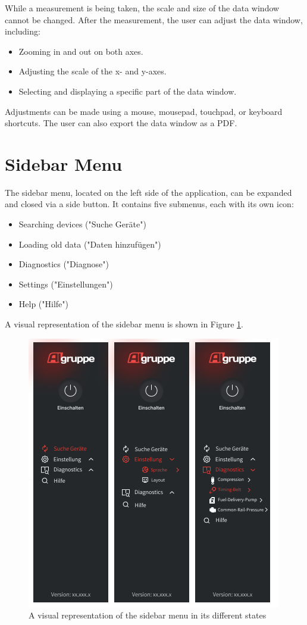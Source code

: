 \documentclass[]{scrreprt}
\begin{document}
While a measurement is being taken, the scale and size of the data window cannot be changed. After the measurement, the user can adjust the data window, including:
\begin{itemize}
\item Zooming in and out on both axes.
\item Adjusting the scale of the x- and y-axes.
\item Selecting and displaying a specific part of the data window.
\end{itemize}

Adjustments can be made using a mouse, mousepad, touchpad, or keyboard shortcuts. The user can also export the data window as a PDF.

\section{Sidebar Menu}

The sidebar menu, located on the left side of the application, can be expanded and closed via a side button. It contains five submenus, each with its own icon:
\begin{itemize}
\item Searching devices ("Suche Geräte")
\item Loading old data ("Daten hinzufügen")
\item Diagnostics ("Diagnose")
\item Settings ("Einstellungen")
\item Help ("Hilfe")
\end{itemize}
A visual representation of the sidebar menu is shown in Figure \ref{fig:sidebarMenu}.

\begin{figure}
\includegraphics[width=.9\textwidth]{assets/pictures/SideBarMenu.png}
\caption[]{A visual representation of the sidebar menu in its different states}
\label{fig:sidebarMenu}
\end{figure}
\end{document}
